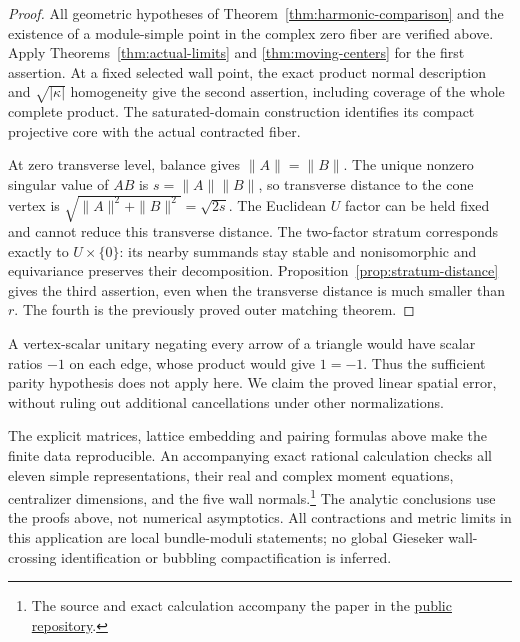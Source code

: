 \begin{proof}
All geometric hypotheses of Theorem~\ref{thm:harmonic-comparison}
and the existence of a module-simple point in the complex zero fiber
are verified above.
Apply Theorems~\ref{thm:actual-limits} and
\ref{thm:moving-centers} for the first assertion.
At a fixed selected wall point, the exact product normal
description and $\sqrt{|\kappa|}$ homogeneity give the second
assertion, including coverage of the whole complete product.
The saturated-domain construction identifies its compact
projective core with the actual contracted fiber.

At zero transverse level, balance gives $\|A\|=\|B\|$.
The unique nonzero singular value of $AB$ is
$s=\|A\|\|B\|$, so transverse distance to the cone vertex is
$\sqrt{\|A\|^2+\|B\|^2}=\sqrt{2s}$.
The Euclidean $U$ factor can be held fixed and cannot reduce
this transverse distance. The two-factor stratum corresponds
exactly to $U\times\{0\}$: its nearby summands stay stable and
nonisomorphic and equivariance preserves their decomposition.
Proposition~\ref{prop:stratum-distance} gives the third assertion,
even when the transverse distance is much smaller than $r$.
The fourth is the previously proved outer matching theorem.
\end{proof}

A vertex-scalar unitary negating every arrow of a triangle would
have scalar ratios $-1$ on each edge, whose product would give
$1=-1$. Thus the sufficient parity hypothesis does not apply here.
We claim the proved linear spatial error, without ruling out
additional cancellations under other normalizations.

The explicit matrices, lattice embedding and pairing formulas
above make the finite data reproducible. An accompanying exact
rational calculation checks all eleven simple representations,
their real and complex moment equations, centralizer dimensions,
and the five wall normals.\footnote{The source and exact calculation
accompany the paper in the
\href{https://github.com/bwuebben/stability-degeneration/tree/main/papers/14_quiver_metric_wall_crossing}{public repository}.}
The analytic conclusions use the
proofs above, not numerical asymptotics. All contractions and
metric limits in this application are local bundle-moduli
statements; no global Gieseker wall-crossing identification or
bubbling compactification is inferred.

